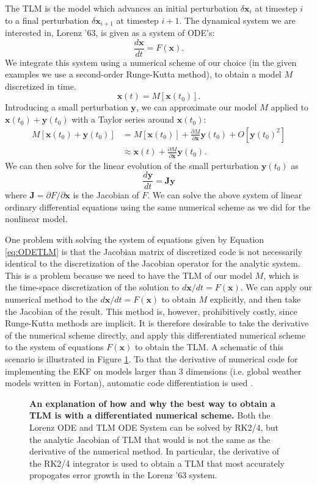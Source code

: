 \documentclass[10pt,letterpaper]{article}
\newcommand{\mbx}{\mathbf{x}}
\newcommand{\mby}{\mathbf{y}}
\begin{document}
The TLM is the model which advances an initial perturbation $\delta \mbx_{i}$ at timestep $i$ to a final perturbation $\delta \mbx_{i+1}$ at timestep $i+1$.
The dynamical system we are interested in, Lorenz '63, is given as a system of ODE's:
\[ \frac{d\mbx}{dt} = F(\mbx) .\]
We integrate this system using a numerical scheme of our choice (in the given examples we use a second-order Runge-Kutta method), to obtain a model $M$ discretized in time.
\[ \mbx(t) = M[ \mbx(t_0) ] .\]
Introducing a small perturbation $\mby$, we can approximate our model $M$ applied to $\mbx(t_0) + \mby(t_0)$ with a Taylor series around $\mbx(t_0)$:
\begin{align*} M[ \mbx(t_0) + \mby(t_0) ] &= M [ \mbx(t_0) ] + \frac{\partial M}{\partial \mbx} \mby(t_0) + O [ \mby(t_0) ^2 ]\\ &\approx \mbx(t) + \frac{\partial M}{\partial \mbx} \mby(t_0) .\end{align*}
We can then solve for the linear evolution of the small perturbation $\mby(t_0)$ as 
\begin{equation} \frac{d\mby }{dt } = \mathbf{J} \mby \label{eq:ODETLM} \end{equation}
where $\mathbf{J} = \partial F / \partial \mbx$ is the Jacobian of $F$.
We can solve the above system of linear ordinary differential equations using the same numerical scheme as we did for the nonlinear model.

One problem with solving the system of equations given by Equation \ref{eq:ODETLM} is that the Jacobian matrix of discretized code is not necessarily identical to the discretization of the Jacobian operator for the analytic system.
This is a problem because we need to have the TLM of our model $M$, which is the time-space discretization of the solution to $d\mbx/dt = F(\mbx)$.
We can apply our numerical method to the $d\mbx/dt = F(\mbx)$ to obtain $M$ explicitly, and then take the Jacobian of the result.
This method is, however, prohibitively costly, since Runge-Kutta methods are implicit.
It is therefore desirable to take the derivative of the numerical scheme directly, and apply this differentiated numerical scheme to the system of equations $F(\mbx)$ to obtain the TLM.
A schematic of this scenario is illustrated in Figure \ref{fig:TLMscheme}.
To that the derivative of numerical code for implementing the EKF on models larger than 3 dimensions (i.e. global weather models written in Fortan), automatic code differentiation is used \cite{autodiff1981}.

\begin{figure}[h]
  \centering
  \caption[An explanation of how and why the best way to obtain a TLM is with a differentiated numerical scheme]{
\textbf{    An explanation of how and why the best way to obtain a TLM is with a differentiated numerical scheme.
}    Both the Lorenz ODE and TLM ODE System can be solved by RK2/4, but the analytic Jacobian of TLM that would is not the same as the derivative of the numerical method.
    In particular, the derivative of the RK2/4 integrator is used to obtain a TLM that most accurately propogates error growth in the Lorenz '63 system.
  }
  \label{fig:TLMscheme}
\end{figure}
\end{document}
